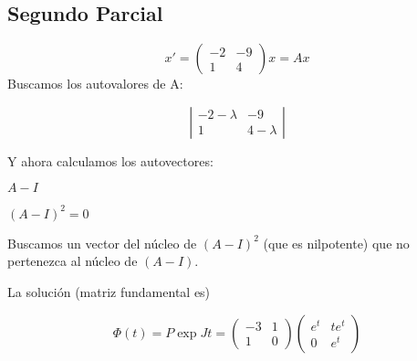\documentclass[nochap]{apuntes}
\begin{document}
\subsection{Segundo Parcial}
\begin{problem}[1]
\[x'=\begin{pmatrix}
-2&-9\\1&4
\end{pmatrix}x = Ax\]
\solution
Buscamos los autovalores de A:

\[\left|\begin{matrix} -2 -\lambda & -9\\1&4-\lambda\end{matrix}\right|\]

Y ahora calculamos los autovectores:

$A-I$

$(A-I)^2 = 0$

Buscamos un vector del núcleo de $(A-I)^2$ (que es nilpotente) que no pertenezca al núcleo de $(A-I)$.

La solución (matriz fundamental es)

\[\Phi(t) = P\exp{Jt} = \begin{pmatrix}
-3&1\\1&0
\end{pmatrix}\begin{pmatrix}
e^t&te^t\\0&e^t
\end{pmatrix}\]
\end{problem}
\end{document}
